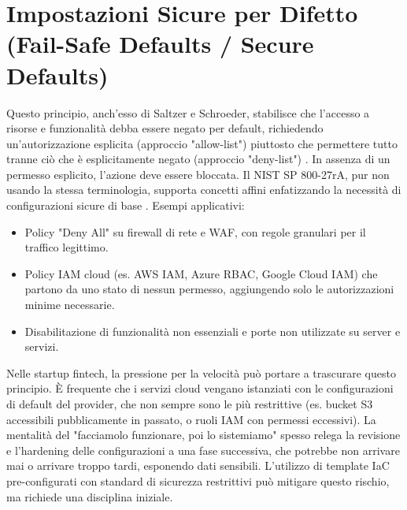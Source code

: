 \section{Impostazioni Sicure per Difetto (Fail-Safe Defaults / Secure Defaults)}
Questo principio, anch'esso di Saltzer e Schroeder, stabilisce che l'accesso a risorse e funzionalità debba essere negato per default, richiedendo un'autorizzazione esplicita (approccio "allow-list") piuttosto che permettere tutto tranne ciò che è esplicitamente negato (approccio "deny-list") \cite{Saltzer_Schroeder_1975}. In assenza di un permesso esplicito, l'azione deve essere bloccata. Il NIST SP 800-27rA, pur non usando la stessa terminologia, supporta concetti affini enfatizzando la necessità di configurazioni sicure di base \cite{NIST_SP_800_27rA}.
Esempi applicativi:
\begin{itemize}
\item Policy "Deny All" su firewall di rete e WAF, con regole granulari per il traffico legittimo.
\item Policy IAM cloud (es. AWS IAM, Azure RBAC, Google Cloud IAM) che partono da uno stato di nessun permesso, aggiungendo solo le autorizzazioni minime necessarie.
\item Disabilitazione di funzionalità non essenziali e porte non utilizzate su server e servizi.
\end{itemize}
Nelle startup fintech, la pressione per la velocità può portare a trascurare questo principio. È frequente che i servizi cloud vengano istanziati con le configurazioni di default del provider, che non sempre sono le più restrittive (es. bucket S3 accessibili pubblicamente in passato, o ruoli IAM con permessi eccessivi). La mentalità del "facciamolo funzionare, poi lo sistemiamo" spesso relega la revisione e l'hardening delle configurazioni a una fase successiva, che potrebbe non arrivare mai o arrivare troppo tardi, esponendo dati sensibili. L'utilizzo di template IaC pre-configurati con standard di sicurezza restrittivi può mitigare questo rischio, ma richiede una disciplina iniziale.
